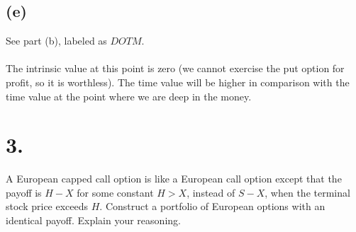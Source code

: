 \documentclass{article}
\begin{document}
{\subsection*{(e)}

See part (b), labeled as $DOTM$. \\ \\
The intrinsic value at this point is zero (we cannot exercise the put option for profit, so it is worthless). 
The time value will be higher in comparison with the time value at the point where we are deep in the money. 

}

\section*{3.}
{\Large 

A European capped call option is like a European call option except that the payoff is $H - X$ for some constant $H > X$, instead of $S - X$, when the terminal stock price exceeds $H$.  Construct a portfolio of European options with an identical payoff. Explain your reasoning. \\ \\




}
\end{document}
